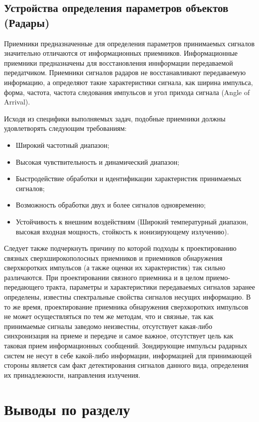 \subsection{Устройства определения параметров объектов (Радары)}
Приемники предназначенные для определения параметров принимаемых сигналов значительно отличаются от информационных приемников. Информационные приемники предназначены для восстановления иннформации передаваемой передатчиком. Приемники сигналов радаров не восстанавливают передаваемую информацию, а определяют такие характеристики сигнала, как ширина импульса, форма, частота, частота следования импульсов и угол прихода сигнала (Angle of Arrival).

Исходя из специфики выполняемых задач, подобные приемники должны удовлетворять следующим требованиям:
\begin{itemize}
\item Широкий частотный диапазон;

\item Высокая чувствительность и динамический диапазон;

\item Быстродействие обработки и идентификации характеристик принимаемых сигналов;

\item Возможность обработки двух и более сигналов одновременно;

\item Устойчивость к внешним воздействиям (Широкий температурный диапазон, высокая входная мощность, стойкость к ионизирующему излучению).
\end{itemize}

 Следует также подчеркнуть причину по которой подходы к проектированию связных сверхширокополосных приемников и приемников обнаружения сверхкоротких импульсов (а также оценки их характеристик) так сильно различаются. При проектировании связного приемника и в целом приемо-передающего тракта, параметры и характеристики передаваемых сигналов заранее определены, известны спектральные свойства сигналов несущих информацию.
 В то же время, проектирование приемника обнаружения сверхкоротких импульсов не может осуществляться по тем же методам, что и связные, так как принимаемые сигналы заведомо неизвестны, отсутствует какая-либо синхронизация на приеме и передаче и самое важное, отсутствует цель как таковая прием информационных сообщений. Зондирующие импульсы радарных систем не несут в себе какой-либо информации, информацией для принимающей стороны является сам факт детектирования сигналов данного вида, определения их принадлежности, направления излучения.

\section{Выводы по разделу}